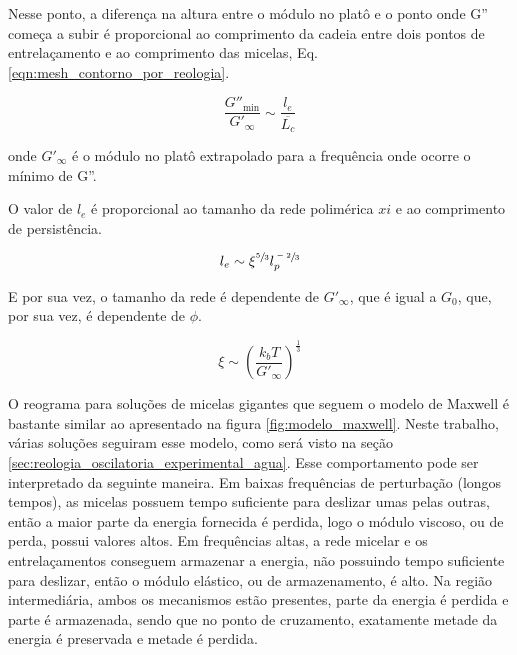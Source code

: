 		Nesse ponto, a diferença na altura entre o módulo no platô e o ponto onde G'' começa a subir é proporcional ao comprimento da cadeia entre dois pontos de entrelaçamento e ao comprimento das micelas, Eq. \ref{eqn:mesh_contorno_por_reologia}.
		
		\begin{equation}
			\frac{G''_\mathrm{min}}{G'_\infty} \sim \frac{l_e}{\overline{L_c}}
			\label{eqn:mesh_contorno_por_reologia}
		\end{equation} %

		\noindent onde \(G'_\infty\) é o módulo no platô extrapolado para a frequência onde ocorre o mínimo de G''.
		
		O valor de \(l_e\) é proporcional ao tamanho da rede polimérica \(xi\) e ao comprimento de persistência.
		
		\begin{equation}
			l_e \sim \xi^{\sfrac{5}{3}} l_p^{\sfrac{-2}{3}}
			\label{eqn:mesh_comprimento_entrelacamento}
		\end{equation} %
		
		E por sua vez, o tamanho da rede é dependente de \(G'_\infty\), que é igual a \(G_0\), que, por sua vez, é dependente de \(\phi\).
		
		\begin{equation}
			\xi \sim \left(  \frac{k_bT}{G'_\infty} \right) ^ \frac{1}{3}
		\end{equation} %
		
		O reograma para soluções de micelas gigantes que seguem o modelo de Maxwell é bastante similar ao apresentado na figura \ref{fig:modelo_maxwell}. Neste trabalho, várias soluções seguiram esse modelo, como será visto na seção \ref{sec:reologia_oscilatoria_experimental_agua}.
		Esse comportamento pode ser interpretado da seguinte maneira. Em baixas frequências de perturbação (longos tempos), as micelas possuem tempo suficiente para deslizar umas pelas outras, então a maior parte da energia fornecida é perdida, logo o módulo viscoso, ou de perda, possui valores altos. Em frequências altas, a rede micelar e os entrelaçamentos conseguem armazenar a energia, não possuindo tempo suficiente para deslizar, então o módulo elástico, ou de armazenamento, é alto. Na região intermediária, ambos os mecanismos estão presentes, parte da energia é perdida e parte é armazenada, sendo que no ponto de cruzamento, exatamente metade da energia é preservada e metade é perdida.
		
		
